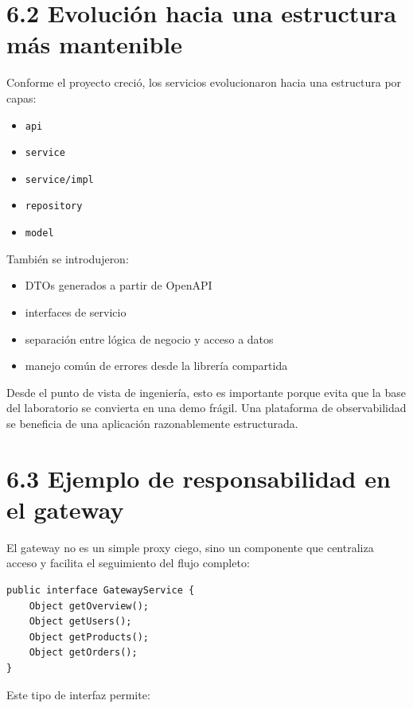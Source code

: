 \documentclass[
a4paper,
12pt]{report}
\providecommand{\tightlist}{%
  \setlength{\itemsep}{0pt}\setlength{\parskip}{0pt}}
\begin{document}
\section{6.2 Evolución hacia una estructura más
mantenible}\label{evoluciuxf3n-hacia-una-estructura-muxe1s-mantenible}

Conforme el proyecto creció, los servicios evolucionaron hacia una
estructura por capas:

\begin{itemize}
\tightlist
\item
  \texttt{api}
\item
  \texttt{service}
\item
  \texttt{service/impl}
\item
  \texttt{repository}
\item
  \texttt{model}
\end{itemize}

También se introdujeron:

\begin{itemize}
\tightlist
\item
  DTOs generados a partir de OpenAPI
\item
  interfaces de servicio
\item
  separación entre lógica de negocio y acceso a datos
\item
  manejo común de errores desde la librería compartida
\end{itemize}

Desde el punto de vista de ingeniería, esto es importante porque evita
que la base del laboratorio se convierta en una demo frágil. Una
plataforma de observabilidad se beneficia de una aplicación
razonablemente estructurada.

\section{6.3 Ejemplo de responsabilidad en el
gateway}\label{ejemplo-de-responsabilidad-en-el-gateway}

El gateway no es un simple proxy ciego, sino un componente que
centraliza acceso y facilita el seguimiento del flujo completo:

\begin{verbatim}
public interface GatewayService {
    Object getOverview();
    Object getUsers();
    Object getProducts();
    Object getOrders();
}
\end{verbatim}

Este tipo de interfaz permite:
\end{document}
